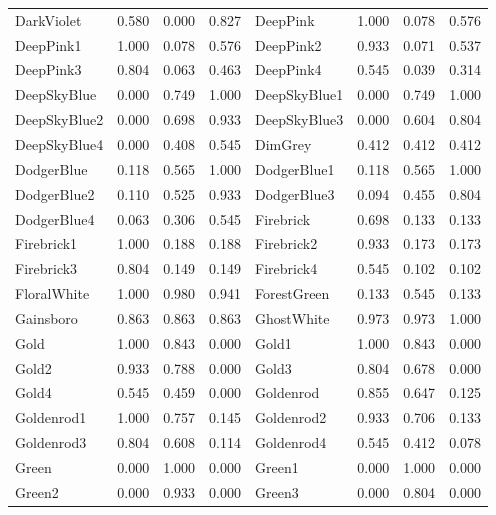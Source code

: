{\begin{center}
\begin{tabular}{|l|l|l|l|l|l|l|l|}
DarkViolet          & 0.580 & 0.000 & 0.827 & DeepPink            & 1.000 & 0.078 & 0.576 \\ 
DeepPink1           & 1.000 & 0.078 & 0.576 & DeepPink2           & 0.933 & 0.071 & 0.537 \\ 
DeepPink3           & 0.804 & 0.063 & 0.463 & DeepPink4           & 0.545 & 0.039 & 0.314 \\ 
DeepSkyBlue         & 0.000 & 0.749 & 1.000 & DeepSkyBlue1        & 0.000 & 0.749 & 1.000 \\ 
DeepSkyBlue2        & 0.000 & 0.698 & 0.933 & DeepSkyBlue3        & 0.000 & 0.604 & 0.804 \\ 
DeepSkyBlue4        & 0.000 & 0.408 & 0.545 & DimGrey             & 0.412 & 0.412 & 0.412 \\ 
DodgerBlue          & 0.118 & 0.565 & 1.000 & DodgerBlue1         & 0.118 & 0.565 & 1.000 \\ 
DodgerBlue2         & 0.110 & 0.525 & 0.933 & DodgerBlue3         & 0.094 & 0.455 & 0.804 \\ 
DodgerBlue4         & 0.063 & 0.306 & 0.545 & Firebrick           & 0.698 & 0.133 & 0.133 \\ 
Firebrick1          & 1.000 & 0.188 & 0.188 & Firebrick2          & 0.933 & 0.173 & 0.173 \\ 
Firebrick3          & 0.804 & 0.149 & 0.149 & Firebrick4          & 0.545 & 0.102 & 0.102 \\ 
FloralWhite         & 1.000 & 0.980 & 0.941 & ForestGreen         & 0.133 & 0.545 & 0.133 \\ 
Gainsboro           & 0.863 & 0.863 & 0.863 & GhostWhite          & 0.973 & 0.973 & 1.000 \\ 
Gold                & 1.000 & 0.843 & 0.000 & Gold1               & 1.000 & 0.843 & 0.000 \\ 
Gold2               & 0.933 & 0.788 & 0.000 & Gold3               & 0.804 & 0.678 & 0.000 \\ 
Gold4               & 0.545 & 0.459 & 0.000 & Goldenrod           & 0.855 & 0.647 & 0.125 \\ 
Goldenrod1          & 1.000 & 0.757 & 0.145 & Goldenrod2          & 0.933 & 0.706 & 0.133 \\ 
Goldenrod3          & 0.804 & 0.608 & 0.114 & Goldenrod4          & 0.545 & 0.412 & 0.078 \\ 
Green               & 0.000 & 1.000 & 0.000 & Green1              & 0.000 & 1.000 & 0.000 \\ 
Green2              & 0.000 & 0.933 & 0.000 & Green3              & 0.000 & 0.804 & 0.000 \\ 

\end{tabular}
\end{center}}
